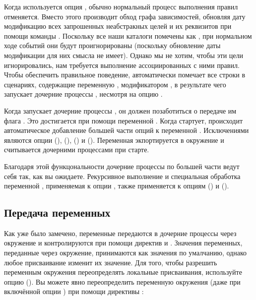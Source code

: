 Когда используется опция , обычно нормальный
процесс выполнения правил отменяется. Вместо этого \GNUmake{}
производит обход графа зависимостей, обновляя дату модификацию всех
запрошенных неабстракных целей и их реквизитов при помощи команды
.  Поскольку все наши каталоги помечены как
, при нормальном ходе событий они будут
проигнорированы (поскольку обновление даты модификации для них смысла
не имеет). Однако мы не хотим, чтобы эти цели игнорировались, нам
требуется выполнение ассоциированных с ними правил. Чтобы обеспечить
правильное поведение, \GNUmake{} автоматически помечает все строки в
сценариях, содержащие переменную , модификатором
\command{+}, в результате чего \GNUmake{} запускает дочерние процессы
\GNUmake{}, несмотря на опцию .

Когда \GNUmake{} запускает дочерние процессы \GNUmake{}, он должен
позаботиться о передаче им флага . Это достигается при
помощи переменной . Когда \GNUmake{} стартует,
происходит автоматическое добавление большей части опций к переменной
. Исключениями являются опции
 (), 
(),  () и
 (). Переменная
 экпортируется в окружение и считывается дочерними
процессами \GNUmake{} при старте.

Благодаря этой функцональности дочерние процессы \GNUmake{} по
большей части ведут себя так, как вы ожидаете. Рекурсивное выполнение
 и специальная обработка переменной
, применяемая к опции , также
применяется к опциям  () и
 ().


\subsection{Передача переменных}

Как уже было замечено, переменные передаются в дочерние процессы
\GNUmake{} через окружение и контролируются при помощи директив
 и . Значения переменных, переданные
через окружение, принимаются как значения по умалчанию, однако любое
присваивание изменит их значение. Для того, чтобы разрешить переменным
окружения переопределять локальные присваивания, используйте опцию
 (). Вы можете явно
переопределить переменную окружения (даже при включённой опции
) при помощи директивы
:

